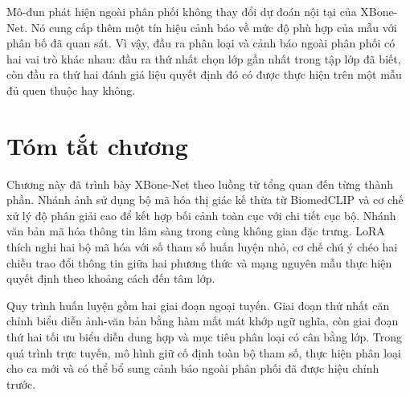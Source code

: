 Mô-đun phát hiện ngoài phân phối không thay đổi dự đoán nội tại của XBone-Net. Nó cung cấp thêm một tín hiệu cảnh báo về mức độ phù hợp của mẫu với phân bố đã quan sát. Vì vậy, đầu ra phân loại và cảnh báo ngoài phân phối có hai vai trò khác nhau: đầu ra thứ nhất chọn lớp gần nhất trong tập lớp đã biết, còn đầu ra thứ hai đánh giá liệu quyết định đó có được thực hiện trên một mẫu đủ quen thuộc hay không.

\section{Tóm tắt chương}

Chương này đã trình bày XBone-Net theo luồng từ tổng quan đến từng thành phần. Nhánh ảnh sử dụng bộ mã hóa thị giác kế thừa từ BiomedCLIP và cơ chế xử lý độ phân giải cao để kết hợp bối cảnh toàn cục với chi tiết cục bộ. Nhánh văn bản mã hóa thông tin lâm sàng trong cùng không gian đặc trưng. LoRA thích nghi hai bộ mã hóa với số tham số huấn luyện nhỏ, cơ chế chú ý chéo hai chiều trao đổi thông tin giữa hai phương thức và mạng nguyên mẫu thực hiện quyết định theo khoảng cách đến tâm lớp.

Quy trình huấn luyện gồm hai giai đoạn ngoại tuyến. Giai đoạn thứ nhất căn chỉnh biểu diễn ảnh-văn bản bằng hàm mất mát khớp ngữ nghĩa, còn giai đoạn thứ hai tối ưu biểu diễn dung hợp và mục tiêu phân loại có cân bằng lớp. Trong quá trình trực tuyến, mô hình giữ cố định toàn bộ tham số, thực hiện phân loại cho ca mới và có thể bổ sung cảnh báo ngoài phân phối đã được hiệu chỉnh trước.
